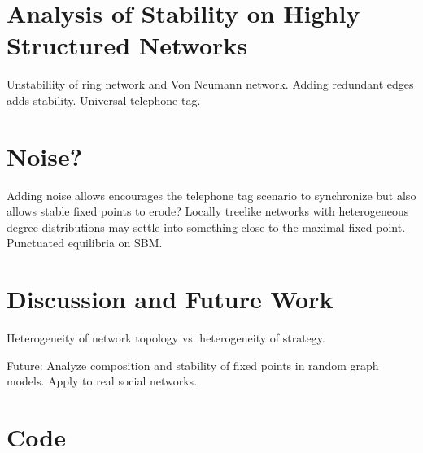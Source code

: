 \documentclass[12pt]{article}
\begin{document}
\section{Analysis of Stability on Highly Structured Networks}

Unstabiliity of ring network and Von Neumann network.  Adding redundant edges adds stability.  Universal telephone tag.

\section{Noise?}
Adding noise allows encourages the telephone tag scenario to synchronize but also allows stable fixed points to erode?  Locally treelike networks with heterogeneous degree distributions may settle into something close to the maximal fixed point.  Punctuated equilibria on SBM.

\section{Discussion and Future Work}
Heterogeneity of network topology vs. heterogeneity of strategy.

Future: Analyze composition and stability of fixed points in random graph models.  Apply to real social networks.

\section*{Code}
\end{document}
